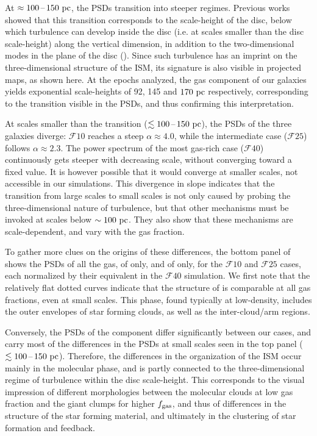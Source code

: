 \documentclass[useAMS,usenatbib]{mnras}
\newcommand{\fgas}{\ensuremath{f_{\rm gas}}\xspace}
\newcommand{\gs}{\ensuremath{\mathcal{F}10}\xspace}
\newcommand{\gm}{\ensuremath{\mathcal{F}25}\xspace}
\newcommand{\gl}{\ensuremath{\mathcal{F}40}\xspace}
\begin{document}
At $\approx 100 \textrm{\,--\,} 150 \mathrm{~pc}$, the PSDs transition into steeper regimes. Previous works showed that this transition corresponds to the scale-height of the disc, below which turbulence can develop inside the disc (i.e. at scales smaller than the disc scale-height) along the vertical dimension, in addition to the two-dimensional modes in the plane of the disc (\citealt{Elmegreen2001, Padoan2001, Dutta2009, Renaud2013b}). Since such turbulence has an imprint on the three-dimensional structure of the ISM, its signature is also visible in projected maps, as shown here. At the epochs analyzed, the gas component of our galaxies yields exponential scale-heights of 92, 145 and $170 \mathrm{~pc}$ respectively, corresponding to the transition visible in the PSDs, and thus confirming this interpretation.

At scales smaller than the transition ($\lesssim 100\textrm{\,--\,} 150 \mathrm{~pc}$), the PSDs of the three galaxies diverge: \gs reaches a steep $\alpha \approx 4.0$, while the intermediate case (\gm) follows $\alpha \approx 2.3$. The power spectrum of the most gas-rich case (\gl) continuously gets steeper with decreasing scale, without converging toward a fixed value. It is however possible that it would converge at smaller scales, not accessible in our simulations. This divergence in slope indicates that the transition from large scales to small scales is not only caused by probing the three-dimensional nature of turbulence, but that other mechanisms must be invoked at scales below $\sim 100 \mathrm{~pc}$. They also show that these mechanisms are scale-dependent, and vary with the gas fraction.

To gather more clues on the origins of these differences, the bottom panel of  shows the PSDs of all the gas, of \hi only, and of \htwo only, for the \gs and \gm cases, each normalized by their equivalent in the \gl simulation. We first note that the relatively flat dotted curves indicate that the structure of \hi is comparable at all gas fractions, even at small scales. This phase, found typically at low-density, includes the outer envelopes of star forming clouds, as well as the inter-cloud/arm regions.

Conversely, the PSDs of the \htwo component differ significantly between our cases, and carry most of the differences in the PSDs at small scales seen in the top panel ($\lesssim 100 \textrm{\,--\,} 150 \mathrm{~pc}$). Therefore, the differences in the organization of the ISM occur mainly in the molecular phase, and is partly connected to the three-dimensional regime of turbulence within the disc scale-height. This corresponds to the visual impression of different morphologies between the molecular clouds at low gas fraction and the giant clumps for higher \fgas, and thus of differences in the structure of the star forming material, and ultimately in the clustering of star formation and feedback.
\end{document}
